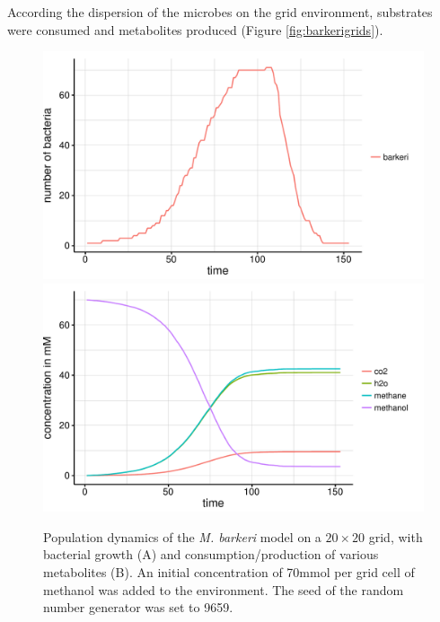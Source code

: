 According the dispersion of the microbes on the grid environment, substrates were consumed and metabolites produced (Figure \hyperref[fig:barkerigrids]{\ref{fig:barkerigrids}}).
\begin{figure}[h!]
  \centering
    \includegraphics[scale=0.45]{../results/barkeri_20x20_seed9659_growth.pdf}
    \includegraphics[scale=0.45]{../results/barkeri_20x20_seed9659_subs.pdf}
  \caption{Population dynamics of the \emph{M. barkeri} model on a $20\times20$ grid, with bacterial growth (A) and consumption/production of various metabolites (B). An initial concentration of 70\;mmol per grid cell of methanol was added to the environment. The seed of the random number generator was set to 9659.}
  \label{fig:barkerisg}
\end{figure}
